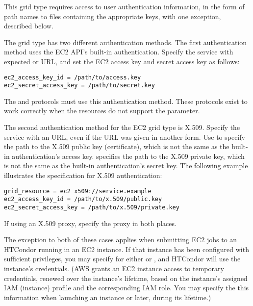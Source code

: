 This grid type requires access to user authentication information,
in the form of path names to files containing the appropriate keys,
with one exception, described below.

The  grid type has two different authentication methods.
The first authentication method uses the EC2 API's built-in authentication.
Specify the service with expected  or  URL,
and set the EC2 access key and secret access key as follows:

\begin{verbatim}
ec2_access_key_id = /path/to/access.key
ec2_secret_access_key = /path/to/secret.key
\end{verbatim}

The  and  protocols must use this
authentication method.
These protocols exist to work correctly when the resources do not support
the  parameter.

The second authentication method for the EC2 grid type is X.509.
Specify the service with an  URL, 
even if the URL was given in another form.  
Use  to 
specify the path to the X.509 public key (certificate),
which is not the same as the built-in authentication's access key.
 specifies the path to the X.509 
private key,
which is not the same as the built-in authentication's secret key.
The following example illustrates the specification for X.509 authentication:

\begin{verbatim}
grid_resource = ec2 x509://service.example
ec2_access_key_id = /path/to/x.509/public.key
ec2_secret_access_key = /path/to/x.509/private.key
\end{verbatim}

If using an X.509 proxy, specify the proxy in both places.

The exception to both of these cases applies when submitting EC2 jobs
to an HTCondor running in an EC2 instance.  If that instance has been
configured with sufficient privileges, you may specify 
for either  or
, and HTCondor will use the
instance's credentials.  (AWS grants an EC2 instance access to temporary
credentials, renewed over the instance's lifetime, based on the instance's
assigned IAM (instance) profile and the corresponding IAM role.  You may
specify the this information when launching an instance or later, during
its lifetime.)

